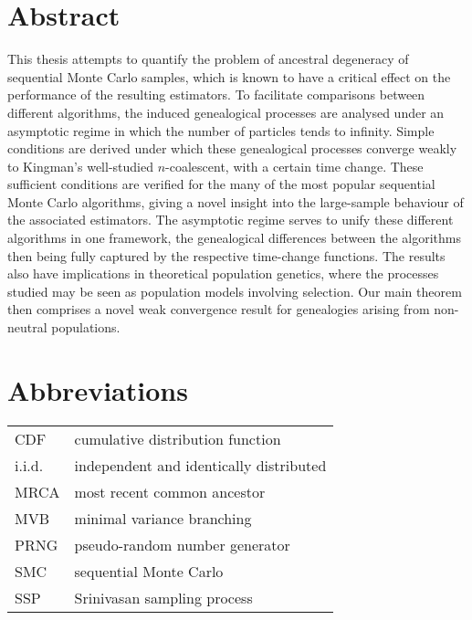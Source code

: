 \documentclass[oneside]{scrbook} %
\theoremstyle{definition}
\newcommand{\1}[1]{\mathbbm{1}_{#1}} %
\begin{document}
\chapter*{Abstract}
This thesis attempts to quantify the problem of ancestral degeneracy of sequential Monte Carlo samples, which is known to  have a critical effect on the performance of the resulting estimators.
To facilitate comparisons between different algorithms, the induced genealogical processes are analysed under an asymptotic regime in which the number of particles tends to infinity. 
Simple conditions are derived under which these genealogical processes converge weakly to Kingman's well-studied $n$-coalescent, with a certain time change.
These sufficient conditions are verified for the many of the most popular sequential Monte Carlo algorithms, giving a novel insight into the large-sample behaviour of the associated estimators.
The asymptotic regime serves to unify these different algorithms in one framework, the genealogical differences between the algorithms then being fully captured by the respective time-change functions.
The results also have implications in theoretical population genetics, where the processes studied may be seen as population models involving selection. Our main theorem then comprises a novel weak convergence result for genealogies arising from non-neutral populations.














\chapter{Abbreviations}
\begin{tabular}{p{} p{}}
CDF & cumulative distribution function \\
i.i.d. & independent and identically distributed \\
MRCA & most recent common ancestor \\
MVB & minimal variance branching \\
PRNG & pseudo-random number generator \\
SMC & sequential Monte Carlo \\
SSP & Srinivasan sampling process \\
\end{tabular}
\end{document}
